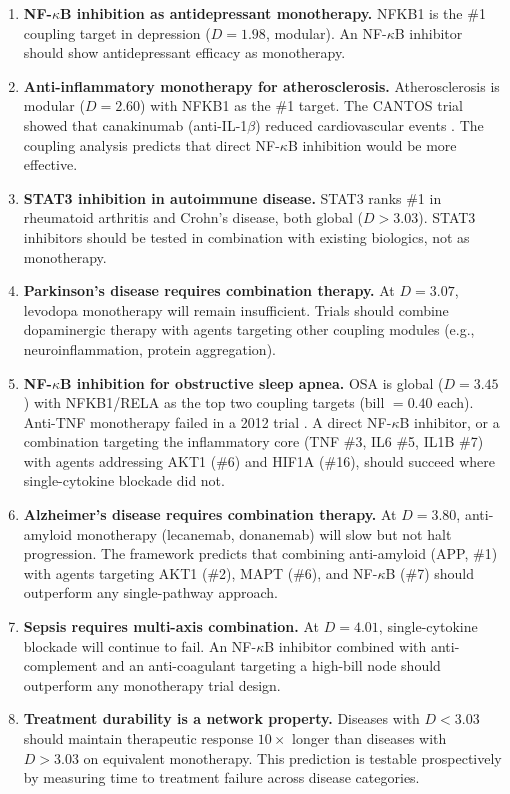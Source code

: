 \documentclass[11pt,a4paper]{article}
\begin{document}
\begin{enumerate}
\item \textbf{NF-$\kappa$B inhibition as antidepressant monotherapy.} NFKB1 is the \#1 coupling target in depression ($D = 1.98$, modular). An NF-$\kappa$B inhibitor should show antidepressant efficacy as monotherapy.

\item \textbf{Anti-inflammatory monotherapy for atherosclerosis.} Atherosclerosis is modular ($D = 2.60$) with NFKB1 as the \#1 target. The CANTOS trial showed that canakinumab (anti-IL-1$\beta$) reduced cardiovascular events \citep{ridker2017}. The coupling analysis predicts that direct NF-$\kappa$B inhibition would be more effective.

\item \textbf{STAT3 inhibition in autoimmune disease.} STAT3 ranks \#1 in rheumatoid arthritis and Crohn's disease, both global ($D > 3.03$). STAT3 inhibitors should be tested in combination with existing biologics, not as monotherapy.

\item \textbf{Parkinson's disease requires combination therapy.} At $D = 3.07$, levodopa monotherapy will remain insufficient. Trials should combine dopaminergic therapy with agents targeting other coupling modules (e.g., neuroinflammation, protein aggregation).

\item \textbf{NF-$\kappa$B inhibition for obstructive sleep apnea.} OSA is global ($D = 3.45$) with NFKB1/RELA as the top two coupling targets (bill $= 0.40$ each). Anti-TNF monotherapy failed in a 2012 trial \citep{maari2014}. A direct NF-$\kappa$B inhibitor, or a combination targeting the inflammatory core (TNF \#3, IL6 \#5, IL1B \#7) with agents addressing AKT1 (\#6) and HIF1A (\#16), should succeed where single-cytokine blockade did not.

\item \textbf{Alzheimer's disease requires combination therapy.} At $D = 3.80$, anti-amyloid monotherapy (lecanemab, donanemab) will slow but not halt progression. The framework predicts that combining anti-amyloid (APP, \#1) with agents targeting AKT1 (\#2), MAPT (\#6), and NF-$\kappa$B (\#7) should outperform any single-pathway approach.

\item \textbf{Sepsis requires multi-axis combination.} At $D = 4.01$, single-cytokine blockade will continue to fail. An NF-$\kappa$B inhibitor combined with anti-complement and an anti-coagulant targeting a high-bill node should outperform any monotherapy trial design.

\item \textbf{Treatment durability is a network property.} Diseases with $D < 3.03$ should maintain therapeutic response $10\times$ longer than diseases with $D > 3.03$ on equivalent monotherapy. This prediction is testable prospectively by measuring time to treatment failure across disease categories.
\end{enumerate}
\end{document}

